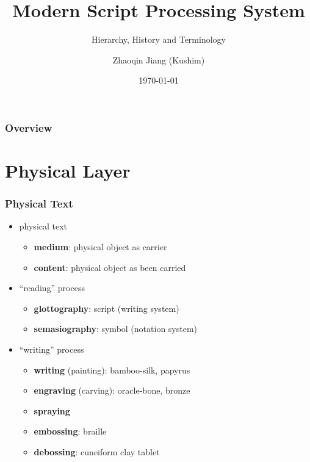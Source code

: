 \documentclass{beamer}
\title[MSPS]{Modern Script Processing System}
\subtitle{Hierarchy, History and Terminology}
\author{Zhaoqin Jiang (Kushim)}
\institute{
	Institute of Software, Chinese Academy of Sciences \\ 
	\medskip
	\url{https://github.com/Kushim-Jiang/msps} \\
    \url{mailto:jiangzhaoqin@iscas.ac.cn}
}
\date{\today}
\begin{document}
	
	\begin{frame}
		\titlepage
	\end{frame}
	
	\begin{frame}
		\frametitle{Overview}
		\tableofcontents
	\end{frame}

	
	\section{Physical Layer}
	
	\begin{frame}
		\frametitle{Physical Text}

		\begin{itemize}
			\item physical text
			\begin{itemize}
				\item \textbf{medium}: physical object as carrier
				\item \textbf{content}: physical object as been carried
			\end{itemize}
			\item ``reading'' process
			\begin{itemize}
				\item \textbf{glottography}: script (writing system)
				\item \textbf{semasiography}: symbol (notation system)
			\end{itemize}
			\item ``writing'' process
			\begin{itemize}
				\item \textbf{writing} (painting): bamboo-silk, papyrus
				\item \textbf{engraving} (carving): oracle-bone, bronze
				\item \textbf{spraying}
				\item \textbf{embossing}: braille
				\item \textbf{debossing}: cuneiform clay tablet
			\end{itemize}
		\end{itemize}
	\end{frame}
	
\end{document}
